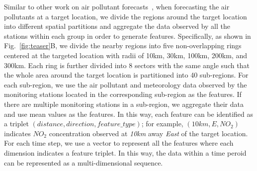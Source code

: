 Similar to other work on air pollutant forecasts~\cite{zheng2015forecasting}, when forecasting the air pollutants at a target location, we divide the regions around the target location into different spatial partitions and aggregate the data observed by all the stations within each group in order to generate features.
Specifically, as shown in Fig.~\ref{fig:teaser}B, we divide the nearby regions into five non-overlapping rings centered at the targeted location with radii of 10km, 30km, 100km, 200km, and 300km.
Each ring is further divided into 8 sectors with the same angle such that the whole area around the target location is partitioned into 40 sub-regions. 
For each sub-region, we use the air pollutant and meteorology data observed by the monitoring stations located in the corresponding sub-region as the features.
If there are multiple monitoring stations in a sub-region, we aggregate their data and use mean values as the features.
In this way, each feature can be identified as a triplet $(distance, direction, feature\_type)$; for example, $(10km, E, NO_{2})$ indicates $NO_{2}$ concentration observed at \textit{10km} away \textit{East} of the target location. 
For each time step, we use a vector to represent all the features where each dimension indicates a feature triplet.
In this way, the data within a time peroid can be represented as a multi-dimensional sequence. 

